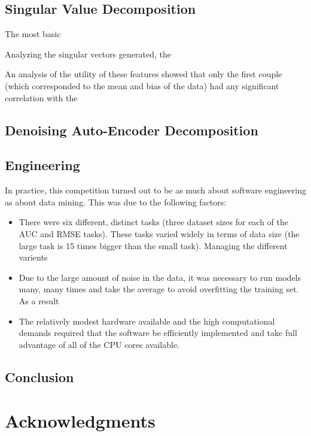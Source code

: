 \documentclass{article}
\begin{document}
\subsection{Singular Value Decomposition}

The most basic

Analyzing the singular vectors generated, the 


An analysis of the utility of these features showed that only the first couple
(which corresponded to the mean and bias of the data) had any significant
correlation with the 

\subsection{Denoising Auto-Encoder Decomposition}

\subsection{Engineering}

In practice, this competition turned out to be as much about software
engineering as about data mining.  This was due to the following factors:
\begin{itemize}
\item There were six different, distinct tasks (three dataset sizes for each of the AUC and RMSE tasks).  These tasks varied widely in terms of data size (the large task is 15 times bigger than the small task).  Managing the different varients
\item Due to the large amount of noise in the data, it was necessary to run models many, many times and take the average to avoid overfitting the training set.  As a result
\item The relatively modest hardware available and the high computational demands required that the software be efficiently implemented and take full advantage of all of the CPU cores available.
\end{itemize}

\subsection{Conclusion}


\section*{Acknowledgments} 
 


\end{document}
